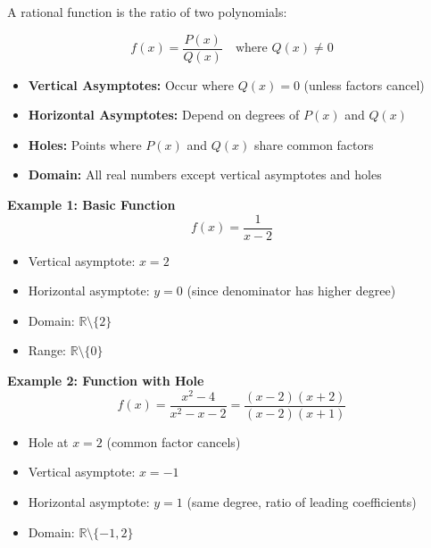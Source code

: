 \documentclass{article} %
\begin{document}
A rational function is the ratio of two polynomials:

\[
f(x) = \frac{P(x)}{Q(x)} \quad \text{where } Q(x) \neq 0
\]

\begin{itemize}
    \item \textbf{Vertical Asymptotes:} Occur where $Q(x) = 0$ (unless factors cancel)
    \item \textbf{Horizontal Asymptotes:} Depend on degrees of $P(x)$ and $Q(x)$
    \item \textbf{Holes:} Points where $P(x)$ and $Q(x)$ share common factors
    \item \textbf{Domain:} All real numbers except vertical asymptotes and holes
\end{itemize}

\textbf{Example 1: Basic Function}
\[
f(x) = \frac{1}{x-2}
\]

\begin{itemize}
    \item Vertical asymptote: $x = 2$
    \item Horizontal asymptote: $y = 0$ (since denominator has higher degree)
    \item Domain: $\mathbb{R} \setminus \{2\}$
    \item Range: $\mathbb{R} \setminus \{0\}$
\end{itemize}

\textbf{Example 2: Function with Hole}
\[
f(x) = \frac{x^2-4}{x^2-x-2} = \frac{(x-2)(x+2)}{(x-2)(x+1)}
\]

\begin{itemize}
    \item Hole at $x=2$ (common factor cancels)
    \item Vertical asymptote: $x=-1$
    \item Horizontal asymptote: $y=1$ (same degree, ratio of leading coefficients)
    \item Domain: $\mathbb{R} \setminus \{-1,2\}$
\end{itemize}
\end{document}
